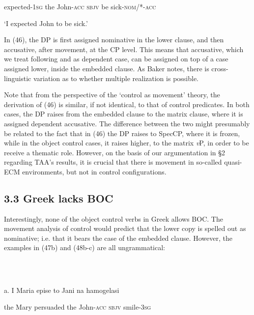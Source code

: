 \documentclass[output=paper]{langsci/langscibook}
\begin{document}
  expected{}-\textsc{1sg} the John\textsc{{}-acc} \textsc{sbjv} be sick\textsc{{}-nom}/*\textsc{{}-acc} 

  ‘I expected John to be sick.’ 

In (46), the DP is first assigned nominative in the lower clause, and then accusative, after movement, at the CP level. This means that accusative, which we treat following \citet{Marantz1991} and \citet{Baker2015} as dependent case, can be assigned on top of a case assigned lower, inside the embedded clause. As Baker notes, there is cross-linguistic variation as to whether multiple realization is possible. 

  Note that from the perspective of the ‘control as movement’ theory, the derivation of (46) is similar, if not identical, to that of control predicates. In both cases, the DP raises from the embedded clause to the matrix clause, where it is assigned dependent accusative. The difference between the two might presumably be related to the fact that in (46) the DP raises to SpecCP, where it is frozen, while in the object control cases, it raises higher, to the matrix \textit{v}P, in order to be receive a thematic role. However, on the basis of our argumentation in §2 regarding TAA’s results, it is crucial that there is movement in so-called quasi-ECM environments, but not in control configurations. 

\subsection{ 3.3 Greek lacks BOC}

\begin{styleNurTexti}
Interestingly, none of the object control verbs in Greek allows BOC. The movement analysis of control would predict that the lower copy is spelled out as nominative; i.e. that it bears the case of the embedded clause. However, the examples in (47b) and (48b-c) are all ungrammatical:
\end{styleNurTexti}

\begin{styleNurTexti}
\ea%
    \label{ex:key:47}
    \gll\\
        \\
    \glt
    \z

          a.  I     Maria  epise         to   Jani          na     hamogelasi
\end{styleNurTexti}

\begin{styleNurTexti}
    the Mary  persuaded  the John-\textsc{acc}  \textsc{sbjv} smile\textsc{{}-3sg}
\end{styleNurTexti}
\end{document}
